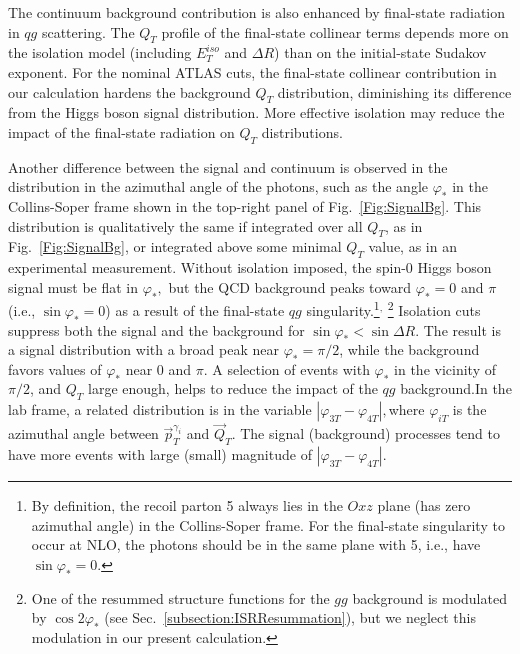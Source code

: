 \documentclass[12pt,english,aps,preprint,prd,letterpaper,fleqn,nofootinbib,showpacs,showkeys,tightenlines,floatfix]{revtex4}
\begin{document}
{The continuum background contribution is also enhanced by final-state
radiation in $qg$ scattering. The $Q_{T}$ profile of the final-state
collinear terms depends more on the isolation model (including $E_{T}^{iso}$
and $\Delta R$) than on the initial-state Sudakov exponent. For the
nominal ATLAS cuts, the final-state collinear contribution in our
calculation hardens the background $Q_{T}$ distribution, diminishing
its difference from the Higgs boson signal distribution. More effective
isolation may reduce the impact of the final-state radiation on $Q_{T}$
distributions.

Another difference between the signal and continuum is observed in
the distribution in the azimuthal angle of the photons, such as the
angle $\varphi_{*}$ in the Collins-Soper frame shown in the top-right 
panel of Fig.~\ref{Fig:SignalBg}.
This distribution is qualitatively the same if integrated over all
$Q_{T}$, as in Fig.~\ref{Fig:SignalBg}, or integrated above some
minimal $Q_{T}$ value, as in an experimental measurement.
Without isolation imposed, the spin-$0$ Higgs boson signal must be
flat in $\varphi_{*},$ but the QCD background peaks toward $\varphi_{*}=0$
and $\pi$ (i.e., $\sin\varphi_{*}=0$) as a result of the final-state
$qg$ singularity.\footnote{By definition, the recoil parton 5 always lies in the $Oxz$ plane (has zero azimuthal
angle) in the Collins-Soper frame. For the final-state singularity
to occur at NLO, the photons should be in the same
plane with 5, i.e., have $\sin\varphi_{*}=0$.}${}^,$ 
\footnote{One of the resummed structure functions for the $gg$ background is
modulated by $\cos2\varphi_{*}$ (see Sec.~\ref{subsection:ISRResummation}),
but we neglect this modulation in our present calculation.} Isolation cuts suppress both the signal and the background for $\sin\varphi_{*}<\sin\Delta R$.
The result is a signal distribution with a broad peak near $\varphi_{*}=\pi/2$,
while the background favors values of $\varphi_{*}$ near $0$ and
$\pi$. A selection of events with $\varphi_{*}$ in the vicinity
of $\pi/2$, and $Q_{T}$ large enough, helps to reduce the impact
of the $qg$ background.In the lab frame, a related distribution 
is in the
variable $\left|\varphi_{3T}-\varphi_{4T}\right|,$where $\varphi_{iT}$
is the azimuthal angle between $\vec{p}_{T}^{\gamma_{i}}$ and $\vec{Q}_{T}$.
The signal (background) processes tend to have more events with large
(small) magnitude of $\left|\varphi_{3T}-\varphi_{4T}\right|$.

}
\end{document}
